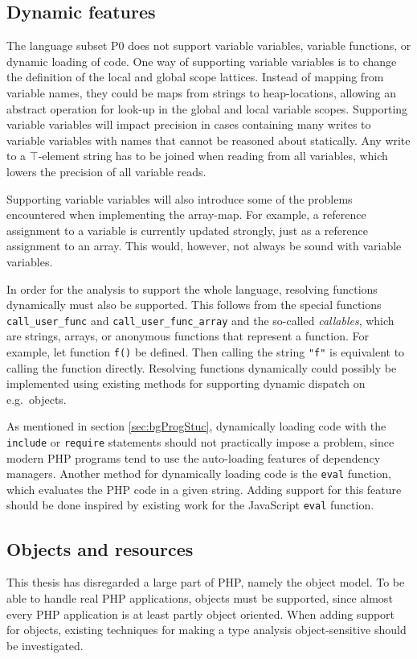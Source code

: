 \subsection{Dynamic features}
The language subset P0 does not support variable variables, variable functions, or dynamic loading of code. One way of supporting variable variables is to change the definition of the local and global scope lattices. Instead of mapping from variable names, they could be maps from strings to heap-locations, allowing an abstract operation for look-up in the global and local variable scopes. Supporting variable variables will impact precision in cases containing many writes to variable variables with names that cannot be reasoned about statically. Any write to a $\top$-element string has to be joined when reading from all variables, which lowers the precision of all variable reads.

Supporting variable variables will also introduce some of the problems encountered when implementing the array-map. For example, a reference assignment to a variable is currently updated strongly, just as a reference assignment to an array. This would, however, not always be sound with variable variables.

In order for the analysis to support the whole language, resolving functions dynamically must also be supported. This follows from the special functions \texttt{call\_user\_func} and \texttt{call\_user\_func\_array} and the so-called \emph{callables}, which are strings, arrays, or anonymous functions that represent a function. For example, let function \texttt{f()} be defined. Then calling the string \texttt{"f"} is equivalent to calling the function directly. Resolving functions dynamically could possibly be implemented using existing methods for supporting dynamic dispatch on e.g.\ objects.

As mentioned in section \ref{sec:bgProgStuc}, dynamically loading code with the \texttt{include} or \texttt{require} statements should not practically impose a problem, since modern PHP programs tend to use the auto-loading features of dependency managers. Another method for dynamically loading code is the \texttt{eval} function, which evaluates the PHP code in a given string. Adding support for this feature should be done inspired by existing work for the JavaScript \texttt{eval} function.

\subsection{Objects and resources}	
This thesis has disregarded a large part of PHP, namely the object model. To be able to handle real PHP applications, objects must be supported, since almost every PHP application is at least partly object oriented. When adding support for objects, existing techniques for making a type analysis object-sensitive should be investigated. 

